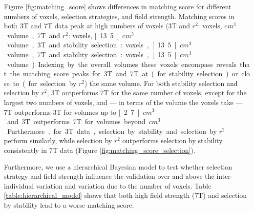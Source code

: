 Figure \ref{fig:matching_score} shows differences in matching score for different numbers of voxels, selection strategies, and field strength. Matching scores in both 3T and 7T data peak at high numbers of voxels (3T and $r^{2}$: \unit[1000]{voxels}, \unit[27]{$cm^{3}$} volume, 7T and $r^{2}$: \unit[5000]{voxels}, \unit[13.5]{$cm^{3}$} volume, 3T and stability selection: \unit[500]{voxels}, \unit[13.5]{$cm^{3}$} volume, 7T and stability selection: \unit[5000]{voxels}, \unit[13.5]{$cm^{3}$} volume). Indexing by the overall volumes these voxels encompass reveals that the matching score peaks for 3T and 7T at (for stability selection) or close to (for selection by $r^{2}$) the same volume. For both stability selection and selection by $r^{2}$, 3T outperforms 7T for the same number of voxels, except for the largest two numbers of voxels, and --- in terms of the volume the voxels take --- 7T outperforms 3T for volumes up to \unit[2.7]{$cm^{3}$} and 3T outperforms 7T for volumes beyond \unit[27]{$cm^{3}$}. Furthermore, for 3T data, selection by stability and selection by $r^{2}$ perform similarly, while selection by $r^{2}$ outperforms selection by stability consistently in 7T data (Figure \ref{fig:matching_score_selection}).

Furthermore, we use a hierarchical Bayesian model to test whether selection strategy and field strength influence the validation over and above the inter-individual variation and variation due to the number of voxels.
Table \ref{table:hierarchical_model} shows that both high field strength (7T) and selection by stability lead to a worse matching score.



